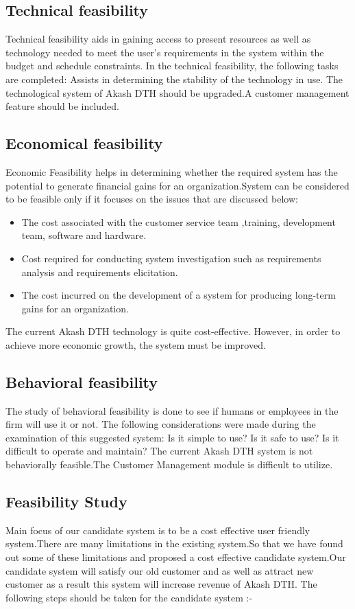 \begin{spacing}{1}
\subsection{Technical feasibility}
Technical feasibility aids in gaining access to present resources as well as technology needed to meet the user's requirements in the system within the budget and schedule constraints. In the technical feasibility, the following tasks are completed:
Assists in determining the stability of the technology in use.
The technological system of Akash DTH should be upgraded.A customer management feature should be included.
\subsection{ Economical feasibility }
 Economic Feasibility helps in determining whether the required system has the potential to generate financial gains for an organization.System can be considered to be feasible only if it focuses on the issues that are discussed below:
\begin{itemize}
\item  The cost associated with the customer service team ,training, development team, software and hardware.
\item  Cost required for conducting system investigation such as requirements analysis and requirements elicitation.
\item  The cost incurred on the development of a system for producing long-term gains for an organization.
\end{itemize}
The current Akash DTH technology is quite cost-effective. However, in order to achieve more economic growth, the system must be improved.

\subsection{Behavioral feasibility}
The study of behavioral feasibility is done to see if humans or employees in the firm will use it or not. The following considerations were made during the examination of this suggested system:
Is it simple to use? Is it safe to use?
Is it difficult to operate and maintain?
The current Akash DTH system is not behaviorally feasible.The Customer Management module is difficult to utilize.


\subsection{Feasibility Study}
Main focus of our candidate system is to be a cost effective user friendly system.There are many limitations in the existing system.So that we have found out some of these limitations and proposed a cost effective candidate system.Our candidate system will satisfy our old customer and as well as attract new customer as a result this system will increase revenue of Akash DTH.
The following steps should be taken for the candidate system :-

\end{spacing}
